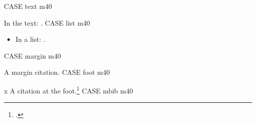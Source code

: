 \documentclass[a4paper,10pt,oneside]{memoir}
\begin{document}
\noindent CASE text m40\par
In the text: .
\clearpage
\noindent CASE list m40\par
\begin{itemize}
\item In a list: .
\end{itemize}
\clearpage
\noindent CASE margin m40\par
A margin citation\autocite{m40}.
\clearpage
\noindent CASE foot m40\par
\noindent x\marginpar{\rule{1pt}{.95\textheight}} A citation at the foot.\footnote{.}
\clearpage
\noindent CASE mbib m40\par
\printbibliography[heading=none]
\end{document}
